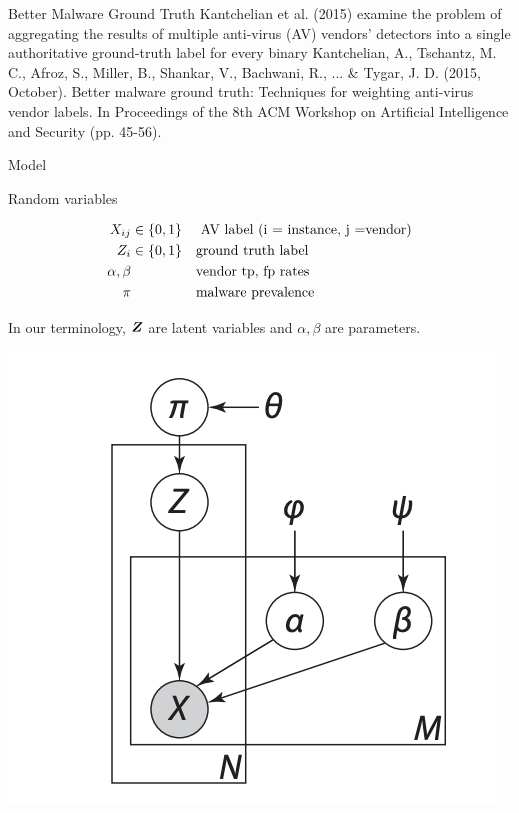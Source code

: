 \documentclass[10pt]{beamer}
\begin{document}
\begin{frame}{Better Malware Ground Truth}
Kantchelian et al. (2015) examine the problem of aggregating the results of multiple anti-virus (AV) vendors’ detectors into a single authoritative ground-truth label for every binary
\vfill \vfill \vfill
\tiny Kantchelian, A., Tschantz, M. C., Afroz, S., Miller, B., Shankar, V., Bachwani, R., ... \& Tygar, J. D. (2015, October). Better malware ground truth: Techniques for weighting anti-virus vendor labels. In Proceedings of the 8th ACM Workshop on Artificial Intelligence and Security (pp. 45-56).
\end{frame}

\begin{frame}{Model}
\footnotesize
\begin{sblock}{Random variables}

\begin{minipage}{.6\textwidth}
\begin{align*}
X_{ij} & \in \{ {0,1} \} && \text{ AV label (i = instance, j =vendor)} \\
Z_i & \in \{ {0,1} \} && \text{ground truth label} \\
\alpha, \beta & && \text{vendor tp, fp rates} \\
\pi & && \text{malware prevalence} 
\end{align*}

In our terminology, ${\boldsymbol Z}$ are latent variables and $\alpha, \beta$ are parameters.
\end{minipage}
\hfill
\begin{minipage}{.35\textwidth}
\begin{center}
\includegraphics[width=.7\textwidth]{images/kantchelian_pgm}
\end{center}
\end{minipage}



\end{sblock}
\end{frame}
\end{document}
